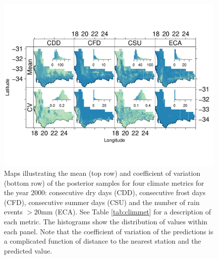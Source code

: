 \documentclass[12pt]{article}
\begin{document}
     \begin{figure}
  \includegraphics[width=1\textwidth]{Figure6.pdf} \caption{Maps
    illustrating the mean (top row) and coefficient of variation (bottom
    row) of the posterior  samples for four climate metrics for the
    year 2000:
    consecutive dry days (CDD), consecutive frost days (CFD),
    consecutive summer days (CSU) and the number of rain events
    $>20$mm (ECA).  
    See Table \ref{tab:climmet} for a description of each metric. 
    The histograms show the distribution of values within each panel. 
    Note that the coefficient of variation of the predictions is a complicated function of
    distance to the nearest station and the predicted value.  }
     \label{fig:metrics}
 \end{figure}
\end{document}
